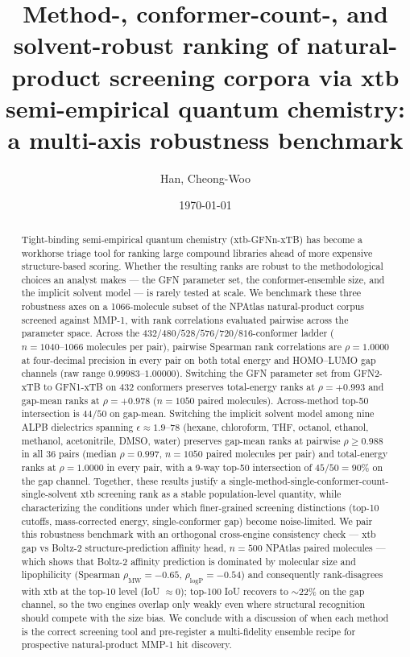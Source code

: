 \documentclass[11pt,a4paper]{article}
\title{Method-, conformer-count-, and solvent-robust ranking of natural-product
screening corpora via xtb semi-empirical quantum chemistry:\\
a multi-axis robustness benchmark}
\author[1,2,3]{Han, Cheong-Woo}
\affil[1]{Genesis Medicine Lab, Seoul, Republic of Korea}
\affil[2]{HAN PREDICT, Inc., \href{https://hanpredict.com}{hanpredict.com}}
\affil[3]{Recover Korean Medicine Clinic, \href{https://recover-clinic.kr}{recover-clinic.kr}}
\date{\today}
\begin{document}
\maketitle

\begin{abstract}
Tight-binding semi-empirical quantum chemistry (xtb-GFNn-xTB) has
become a workhorse triage tool for ranking large compound libraries
ahead of more expensive structure-based scoring. Whether the resulting
ranks are robust to the methodological choices an analyst makes ---
the GFN parameter set, the conformer-ensemble size, and the implicit
solvent model --- is rarely tested at scale. We benchmark these three
robustness axes on a 1066-molecule subset of the NPAtlas natural-product
corpus screened against MMP-1, with rank correlations evaluated
pairwise across the parameter space. Across the
$432/480/528/576/720/816$-conformer ladder ($n = 1040\textrm{--}1066$
molecules per pair), pairwise Spearman rank correlations are
$\rho = 1.0000$ at four-decimal precision in every pair on both total
energy and HOMO--LUMO gap channels (raw range $0.99983$--$1.00000$).
Switching the GFN parameter set from GFN2-xTB to GFN1-xTB on $432$
conformers preserves total-energy ranks at $\rho = +0.993$ and
gap-mean ranks at $\rho = +0.978$ ($n = 1050$ paired molecules).
Across-method top-50 intersection is $44/50$ on gap-mean.
Switching the implicit solvent model among nine ALPB dielectrics
spanning $\epsilon \approx 1.9$--$78$ (hexane, chloroform, THF,
octanol, ethanol, methanol, acetonitrile, DMSO, water) preserves
gap-mean ranks at pairwise $\rho \geq 0.988$ in all 36 pairs (median
$\rho = 0.997$, $n = 1050$ paired molecules per pair) and total-energy
ranks at $\rho = 1.0000$ in every pair, with a 9-way top-50
intersection of $45/50 = 90\%$ on the gap channel. Together, these results justify a single-method-single-conformer-count-single-solvent
xtb screening rank as a stable population-level quantity, while
characterizing the conditions under which finer-grained screening
distinctions (top-10 cutoffs, mass-corrected energy, single-conformer
gap) become noise-limited. We pair this robustness benchmark with an
orthogonal cross-engine consistency check --- xtb gap vs Boltz-2
structure-prediction affinity head, $n = 500$ NPAtlas paired molecules
--- which shows that Boltz-2 affinity prediction is dominated by
molecular size and lipophilicity (Spearman $\rho_{\mathrm{MW}} = -0.65$,
$\rho_{\mathrm{logP}} = -0.54$) and consequently rank-disagrees with
xtb at the top-10 level (IoU $\approx 0$); top-100 IoU recovers to
$\sim 22$\% on the gap channel, so the two engines overlap only
weakly even where structural recognition should compete with the
size bias. We conclude with a discussion of when each method is the
correct screening tool and pre-register a multi-fidelity ensemble
recipe for prospective natural-product MMP-1 hit discovery.
\end{abstract}
\end{document}
